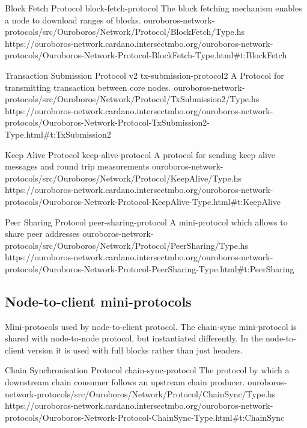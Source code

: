 \miniEntry
    {Block Fetch Protocol}
    {block-fetch-protocol}
    {The block fetching mechanism enables a node to download ranges of blocks.}
    {ouroboros-network-protocols/src/Ouroboros/Network/Protocol/BlockFetch/Type.hs}
    {https://ouroboros-network.cardano.intersectmbo.org/ouroboros-network-protocols/Ouroboros-Network-Protocol-BlockFetch-Type.html\#t:BlockFetch}

\miniEntry
    {Transaction Submission Protocol v2}
    {tx-submission-protocol2}
    {A Protocol for transmitting transaction between core nodes.}
    {ouroboros-network-protocols/src/Ouroboros/Network/Protocol/TxSubmission2/Type.hs}
    {https://ouroboros-network.cardano.intersectmbo.org/ouroboros-network-protocols/Ouroboros-Network-Protocol-TxSubmission2-Type.html\#t:TxSubmission2}

\miniEntry
    {Keep Alive Protocol}
    {keep-alive-protocol}
    {A protocol for sending keep alive messages and round trip measurements}
    {ouroboros-network-protocols/src/Ouroboros/Network/Protocol/KeepAlive/Type.hs}
    {https://ouroboros-network.cardano.intersectmbo.org/ouroboros-network-protocols/Ouroboros-Network-Protocol-KeepAlive-Type.html\#t:KeepAlive}

\miniEntry
    {Peer Sharing Protocol}
    {peer-sharing-protocol}
    {A mini-protocol which allows to share peer addresses}
    {ouroboros-network-protocols/src/Ouroboros/Network/Protocol/PeerSharing/Type.hs}
    {https://ouroboros-network.cardano.intersectmbo.org/ouroboros-network-protocols/Ouroboros-Network-Protocol-PeerSharing-Type.html\#t:PeerSharing}

\subsection{Node-to-client mini-protocols}

Mini-protocols used by node-to-client protocol.  The chain-sync mini-protocol
is shared with node-to-node protocol, but instantiated differently.  In the
node-to-client version it is used with full blocks rather than just headers.

\miniEntry
    {Chain Synchronisation Protocol}
    {chain-sync-protocol}
    {The protocol by which a downstream chain consumer follows an upstream chain producer.}
    {ouroboros-network-protocols/src/Ouroboros/Network/Protocol/ChainSync/Type.hs}
    {https://ouroboros-network.cardano.intersectmbo.org/ouroboros-network-protocols/Ouroboros-Network-Protocol-ChainSync-Type.html\#t:ChainSync}

